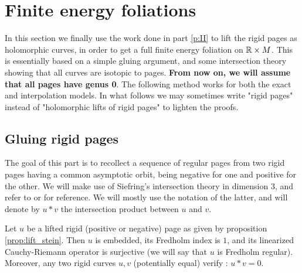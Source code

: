 \documentclass[../main.tex]{subfiles}
\begin{document}
\section{Finite energy foliations}\label{p:III}

In this section we finally use the work done in part \ref{p:II} to lift the rigid pages as holomorphic curves, in order to get a full finite energy foliation on $\mathbb{R}\times M$. This is essentially based on a simple gluing argument, and some intersection theory showing that all curves are isotopic to pages. \textbf{From now on, we will assume that all pages have genus 0}. The following method works for both the exact and interpolation models. In what follows we may sometimes write "rigid pages" instead of "holomorphic lifts of rigid pages" to lighten the proofs.

\subsection{Gluing rigid pages}

The goal of this part is to recollect a sequence of regular pages from two rigid pages having a common asymptotic orbit, being negative for one and positive for the other. We will make use of Siefring's intersection theory in dimension $3$, and refer to \cite{siefring_intersection_2011} or \cite{wendl_contact_2019} for reference. We will mostly use the notation of the latter, and will denote by $u*v$ the intersection product between $u$ and $v$. \\

\begin{lemma}\label{l:index_computation_rigid}
Let $u$ be a lifted rigid (positive or negative) page as given by proposition \ref{prop:lift_stein}. Then $u$ is embedded, its Fredholm index is $1$, and its linearized Cauchy-Riemann operator is surjective (we will say that $u$ is Fredholm regular). Moreover, any two rigid curves $u,v$ (potentially equal) verify : $u*v = 0$.
\end{lemma}
\end{document}
